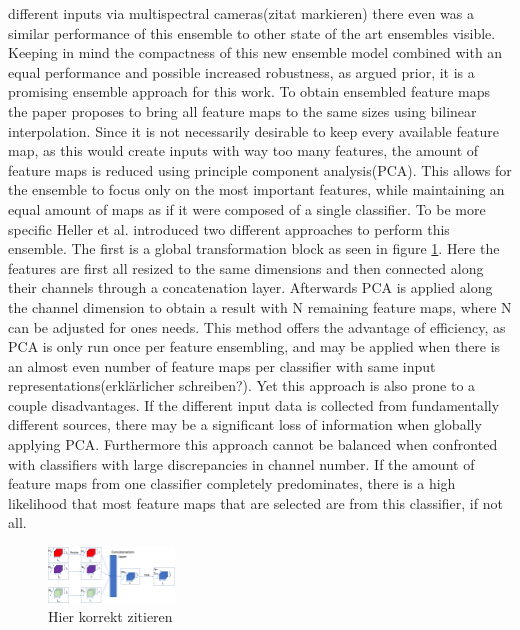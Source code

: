 different inputs via multispectral cameras(zitat markieren) there even was a similar performance of this ensemble to other state of the 
art ensembles visible. Keeping in mind the compactness of this new ensemble model combined with an equal performance and possible 
increased robustness, as argued prior, it is a promising ensemble approach for this work.
To obtain ensembled feature maps the paper proposes to bring all feature maps to the same sizes using bilinear interpolation. Since 
it is not necessarily desirable to keep every available feature map, as this would create inputs with way too many features, the amount of feature 
maps is reduced using principle component analysis(PCA). This allows for the ensemble to focus only on the most important features, while maintaining 
an equal amount of maps as if it were composed of a single classifier. To be more specific Heller et al. \cite{EnsembleHeller2023} introduced two different 
approaches to perform this ensemble. The first is a global transformation block as seen in figure \ref{fig:GTBheller}. 
Here the features are first all resized to the same dimensions and then connected along their channels through a concatenation layer.
Afterwards PCA is applied along the channel dimension to obtain a result with N remaining feature maps, where N can be adjusted for ones 
needs. This method offers the advantage of efficiency, as PCA is only run once per feature ensembling, and may be applied when there is 
an almost even number of feature maps per classifier with same input representations(erklärlicher schreiben?). Yet this approach is also 
prone to a couple disadvantages. If the different input data is collected from fundamentally different sources, there may be a significant 
loss of information when globally applying PCA. Furthermore this approach cannot be balanced when confronted with classifiers with large 
discrepancies in channel number. If the amount of feature maps from one classifier completely predominates, there is a high likelihood 
that most feature maps that are selected are from this classifier, if not all.

\begin{figure}[ht]
    \centering
    \includegraphics[width=0.3\textwidth]{figures/global_transformation_block.jpg}
    \caption{Hier korrekt zitieren}
    \label{fig:GTBheller}
\end{figure}

